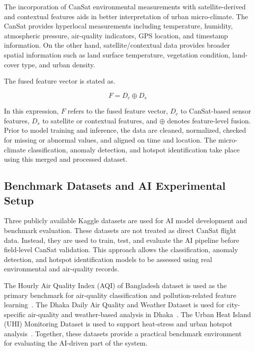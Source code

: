 \documentclass[conference]{IEEEtran}
\begin{document}
The incorporation of CanSat environmental measurements with satellite-derived and contextual features aids in better interpretation of urban micro-climate. The CanSat provides hyperlocal measurements including temperature, humidity, atmospheric pressure, air-quality indicators, GPS location, and timestamp information. On the other hand, satellite/contextual data provides broader spatial information such as land surface temperature, vegetation condition, land-cover type, and urban density.

The fused feature vector is stated as.

\begin{equation}
F = D_c \oplus D_s
\end{equation}

In this expression, $F$ refers to the fused feature vector, $D_c$ to CanSat-based sensor features, $D_s$ to satellite or contextual features, and  $\oplus$ denotes feature-level fusion. Prior to model training and inference, the data are cleaned, normalized, checked for missing or abnormal values, and aligned on time and location. The micro-climate classification, anomaly detection, and hotspot identification take place using this merged and processed dataset.

\subsection{Benchmark Datasets and AI Experimental Setup}

Three publicly available Kaggle datasets are used for AI model development and benchmark evaluation. These datasets are not treated as direct CanSat flight data. Instead, they are used to train, test, and evaluate the AI pipeline before field-level CanSat validation. This approach allows the classification, anomaly detection, and hotspot identification models to be assessed using real environmental and air-quality records.

The Hourly Air Quality Index (AQI) of Bangladesh dataset is used as the primary benchmark for air-quality classification and pollution-related feature learning~\cite{k1}. The Dhaka Daily Air Quality and Weather Dataset is used for city-specific air-quality and weather-based analysis in Dhaka~\cite{k2}. The Urban Heat Island (UHI) Monitoring Dataset is used to support heat-stress and urban hotspot analysis~\cite{k3}. Together, these datasets provide a practical benchmark environment for evaluating the AI-driven part of the system.
\end{document}
